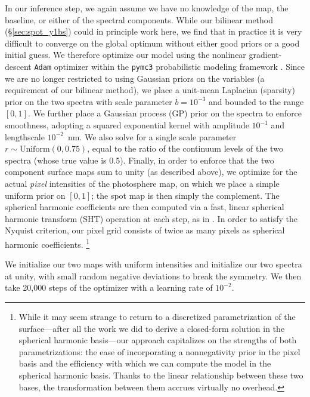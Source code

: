 \documentclass[modern]{aastex631}
\begin{document}
In our inference step, we again assume we have no knowledge of the map, the baseline, or either of the spectral components.
While our bilinear method (\S\ref{sec:spot_y1bs}) could in principle work here, we find that in practice it is very difficult to converge on the global optimum without either good priors or a good initial guess.
We therefore optimize our model using the nonlinear gradient-descent \texttt{Adam} optimizer \citep{Adam} within the \texttt{pymc3} probabilistic modeling framework \citep{Salvatier2016}.
Since we are no longer restricted to using Gaussian priors on the variables (a requirement of our bilinear method), we place a unit-mean Laplacian (sparsity) prior on the two spectra with scale parameter $b = 10^{-3}$ and bounded to the range $[0, 1]$.
%
We further place a Gaussian process (GP) prior on the spectra to enforce smoothness, adopting a squared exponential kernel with amplitude $10^{-1}$ and lengthscale $10^{-2}$~nm.
%
We also solve for a single scale parameter $r \sim \mathrm{Uniform}(0, 0.75)$, equal to the ratio of the continuum levels of the two spectra (whose true value is 0.5).
Finally, in order to enforce that the two component surface maps sum to unity (as described above), we optimize for the actual \emph{pixel} intensities of the photosphere map, on which we place a simple uniform prior on $[0, 1]$; the spot map is then simply the complement.
The spherical harmonic coefficients are then computed via a fast, linear spherical harmonic transform (SHT) operation at each step, as in \citet{Bartolic2021}.
In order to satisfy the Nyquist criterion, our pixel grid consists of twice as many pixels as spherical harmonic coefficients.%
\footnote{%
While it may seem strange to return to a discretized parametrization of the surface---after all the work we did to derive a closed-form solution in the spherical harmonic basis---our approach capitalizes on the strengths of both parametrizations: the ease of incorporating a nonnegativity prior in the pixel basis and the efficiency with which we can compute the model in the spherical harmonic basis.
Thanks to the linear relationship between these two bases, the transformation between them accrues virtually no overhead.}

We initialize our two maps with uniform intensities and initialize our two spectra at unity, with small random negative deviations to break the symmetry.
We then take 20,000 steps of the optimizer with a learning rate of $10^{-2}$.
\end{document}
